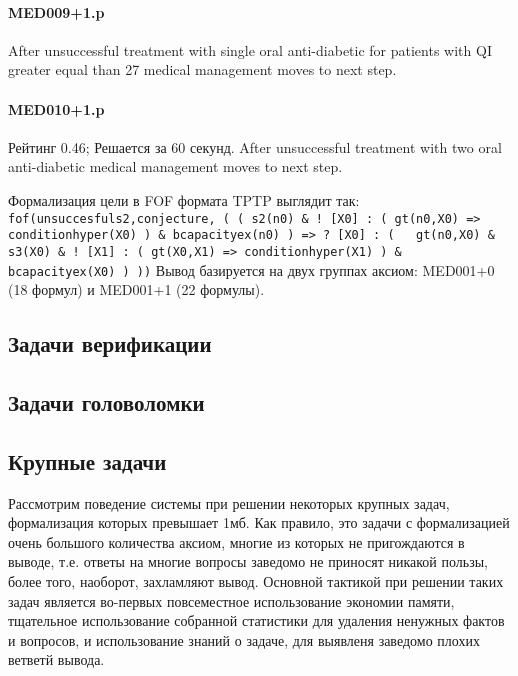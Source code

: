 \paragraph{MED009+1.p}
After unsuccessful treatment with single oral anti-diabetic for patients with QI greater equal than 27 medical management moves to next step.

\paragraph{MED010+1.p}
Рейтинг 0.46; Решается за 60 секунд.
After unsuccessful treatment with two oral anti-diabetic medical management moves to next step.

Формализация цели в FOF формата TPTP выглядит так:
\texttt{fof(unsuccesfuls2,conjecture,
    ( ( s2(n0)
      \& ! [X0] :
          ( gt(n0,X0)
         => conditionhyper(X0) )
      \& bcapacityex(n0) )
   => ? [X0] :
        ( ~ gt(n0,X0)
        \& s3(X0)
        \& ! [X1] :
            ( gt(X0,X1)
           => conditionhyper(X1) )
        \& bcapacityex(X0) ) ))}
Вывод базируется на двух группах аксиом: MED001+0 (18 формул) и MED001+1 (22 формулы).



\subsection{Задачи верификации}


\subsection{Задачи головоломки}



\subsection{Крупные задачи}
Рассмотрим поведение системы при решении некоторых крупных задач, формализация которых превышает 1мб. Как правило, это задачи с формализацией очень большого количества аксиом, многие из которых не пригождаются в выводе, т.е. ответы на многие вопросы заведомо не приносят никакой пользы, более того, наоборот, захламляют вывод. Основной тактикой при решении таких задач является во-первых повсеместное использование экономии памяти, тщательное использование собранной статистики для удаления ненужных фактов и вопросов, и использование знаний о задаче, для выявленя заведомо плохих ветветй вывода.

